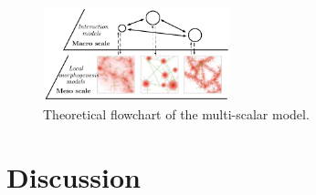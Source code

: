 \documentclass[a4paper,twocolumn,twoside,10pt]{article}
\theoremstyle{definition}
\begin{document}
\begin{figure}[htp]
\centering
\includegraphics[width=0.48\textwidth]{figures/multiscale_morph.pdf}
\caption{Theoretical flowchart of the multi-scalar model.}
\label{fig:model}
\end{figure}


\cite{reuillon2013openmole}



\section{Discussion}




\footnotesize




\end{document}
